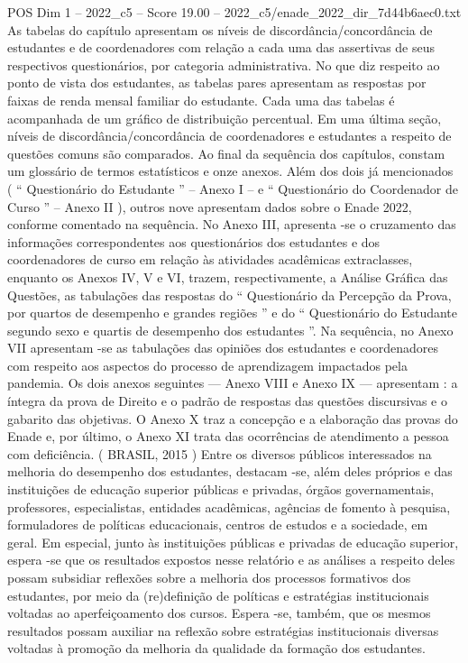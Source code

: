 \begin{textsample}{POS Dim 1 – 2022\_c5 – Score 19.00 – 2022\_c5/enade\_2022\_dir\_7d44b6aec0.txt}
As tabelas do capítulo apresentam os níveis de discordância/concordância de estudantes e de coordenadores com relação a cada uma das assertivas de seus respectivos questionários, por categoria administrativa.
No que diz respeito ao ponto de vista dos estudantes, as tabelas pares apresentam as respostas por faixas de renda mensal familiar do estudante.
Cada uma das tabelas é acompanhada de um gráfico de distribuição percentual.
Em uma última seção, níveis de discordância/concordância de coordenadores e estudantes a respeito de questões comuns são comparados.
Ao final da sequência dos capítulos, constam um glossário de termos estatísticos e onze anexos.
Além dos dois já mencionados ( “ Questionário do Estudante ” – Anexo I – e “ Questionário do Coordenador de Curso ” – Anexo II ), outros nove apresentam dados sobre o Enade 2022, conforme comentado na sequência.
No Anexo III, apresenta -se o cruzamento das informações correspondentes aos questionários dos estudantes e dos coordenadores de curso em relação às atividades acadêmicas extraclasses, enquanto os Anexos IV, V e VI, trazem, respectivamente, a Análise Gráfica das Questões, as tabulações das respostas do “ Questionário da Percepção da Prova, por quartos de desempenho e grandes regiões ” e do “ Questionário do Estudante segundo sexo e quartis de desempenho dos estudantes ”.
Na sequência, no Anexo VII apresentam -se as tabulações das opiniões dos estudantes e coordenadores com respeito aos aspectos do processo de aprendizagem impactados pela pandemia.
Os dois anexos seguintes — Anexo VIII e Anexo IX — apresentam : a íntegra da prova de Direito e o padrão de respostas das questões discursivas e o gabarito das objetivas.
O Anexo X traz a concepção e a elaboração das provas do Enade e, por último, o Anexo XI trata das ocorrências de atendimento a pessoa com deficiência. ( BRASIL, 2015 ) Entre os diversos públicos interessados na melhoria do desempenho dos estudantes, destacam -se, além deles próprios e das instituições de educação superior públicas e privadas, órgãos governamentais, professores, especialistas, entidades acadêmicas, agências de fomento à pesquisa, formuladores de políticas educacionais, centros de estudos e a sociedade, em geral.
Em especial, junto às instituições públicas e privadas de educação superior, espera -se que os resultados expostos nesse relatório e as análises a respeito deles possam subsidiar reflexões sobre a melhoria dos processos formativos dos estudantes, por meio da (re)definição de políticas e estratégias institucionais voltadas ao aperfeiçoamento dos cursos.
Espera -se, também, que os mesmos resultados possam auxiliar na reflexão sobre estratégias institucionais diversas voltadas à promoção da melhoria da qualidade da formação dos estudantes.

\end{textsample}
